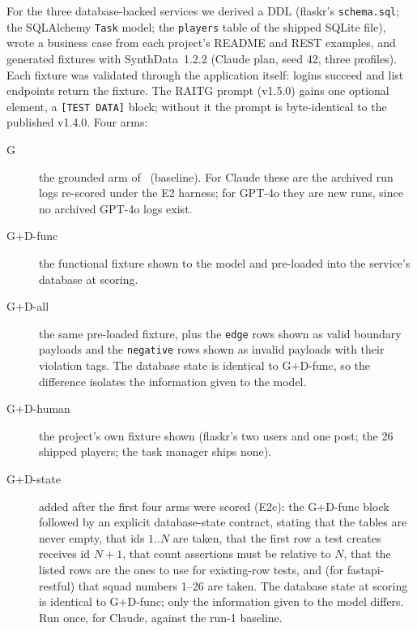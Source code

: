 \documentclass[preprint,12pt]{elsarticle}
\begin{document}
For the three database-backed services we derived a DDL (flaskr's \texttt{schema.sql}; the SQLAlchemy \texttt{Task} model; the \texttt{players} table of the shipped SQLite file), wrote a business case from each project's README and REST examples, and generated fixtures with SynthData~1.2.2 (Claude plan, seed 42, three profiles). Each fixture was validated through the application itself: logins succeed and list endpoints return the fixture. The RAITG prompt (v1.5.0) gains one optional element, a \texttt{[TEST DATA]} block; without it the prompt is byte-identical to the published v1.4.0. Four arms:
\begin{description}
\item[G] the grounded arm of~\cite{javvadi2026raitg} (baseline). For Claude these are the archived run logs re-scored under the E2 harness; for GPT-4o they are new runs, since no archived GPT-4o logs exist.
\item[G+D-func] the functional fixture shown to the model and pre-loaded into the service's database at scoring.
\item[G+D-all] the same pre-loaded fixture, plus the \texttt{edge} rows shown as valid boundary payloads and the \texttt{negative} rows shown as invalid payloads with their violation tags. The database state is identical to G+D-func, so the difference isolates the information given to the model.
\item[G+D-human] the project's own fixture shown (flaskr's two users and one post; the 26 shipped players; the task manager ships none).
\item[G+D-state] added after the first four arms were scored (E2c): the G+D-func block followed by an explicit database-state contract, stating that the tables are never empty, that ids $1..N$ are taken, that the first row a test creates receives id $N+1$, that count assertions must be relative to $N$, that the listed rows are the ones to use for existing-row tests, and (for fastapi-restful) that squad numbers 1--26 are taken. The database state at scoring is identical to G+D-func; only the information given to the model differs. Run once, for Claude, against the run-1 baseline.
\end{description}
\end{document}
